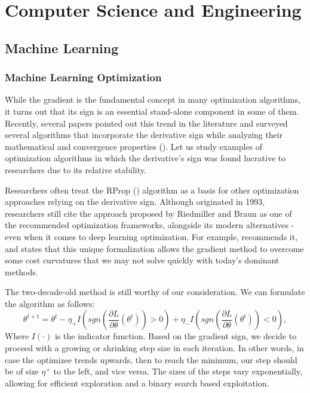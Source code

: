 \documentclass[11pt]{book}
\begin{document}

\section{Computer Science and Engineering}


\subsection{Machine Learning}

\label{machine_learning_subsection}


\subsubsection{Machine Learning Optimization}

While the gradient is the fundamental concept in many optimization
algorithms, it turns out that its sign is an essential stand-alone
component in some of them. Recently, several papers pointed out this
trend in the literature and surveyed several algorithms that incorporate
the derivative sign while analyzing their mathematical and convergence
properties (\cite{wang2019signadam++,moulay2019properties}). Let
us study examples of optimization algorithms in which the derivative's
sign was found lucrative to researchers due to its relative stability.

Researchers often treat the RProp (\cite{riedmiller1993direct}) algorithm
as a basis for other optimization approaches relying on the derivative
sign. Although originated in 1993, researchers still cite the approach
proposed by Riedmiller and Braun as one of the recommended optimization
frameworks, alongside its modern alternatives - even when it comes
to deep learning optimization. For example, \cite{behnke2003hierarchical}
recommends it, and \cite{wang2017origin} states that this unique
formalization allows the gradient method to overcome some cost curvatures
that we may not solve quickly with today's dominant methods.

The two-decade-old method is still worthy of our consideration. We
can formulate the algorithm as follows: 
\[
\theta^{t+1}=\theta^{t}-\eta_{+}I\left(sgn\left(\frac{\partial L}{\partial\theta}\left(\theta^{t}\right)\right)>0\right)+\eta_{-}I\left(sgn\left(\frac{\partial L}{\partial\theta}\left(\theta^{t}\right)\right)<0\right),
\]
Where $I(\cdot)$ is the indicator function. Based on the gradient
sign, we decide to proceed with a growing or shrinking step size in
each iteration. In other words, in case the optimizee trends upwards,
then to reach the minimum, our step should be of size $\eta^{+}$
to the left, and vice versa. The sizes of the steps vary exponentially,
allowing for efficient exploration and a binary search based exploitation.
\end{document}
